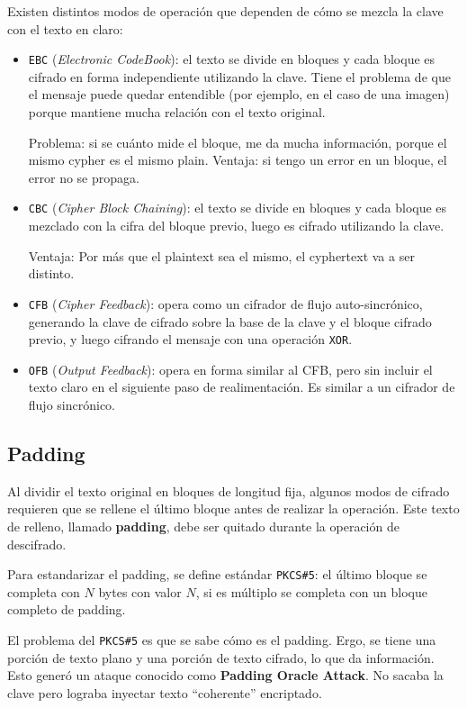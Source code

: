 Existen distintos modos de operación que dependen de cómo se mezcla la clave con el texto en claro:
\begin{itemize}
	\item \texttt{EBC} (\emph{Electronic CodeBook}): el texto se divide en bloques y cada bloque es cifrado en forma independiente utilizando la clave. Tiene el problema de que el mensaje puede quedar entendible (por ejemplo, en el caso de una imagen) porque mantiene mucha relación con el texto original.

	Problema: si se cuánto mide el bloque, me da mucha información, porque el mismo cypher es el mismo plain.
	Ventaja: si tengo un error en un bloque, el error no se propaga.

	\item \texttt{CBC} (\emph{Cipher Block Chaining}): el texto se divide en bloques y cada bloque es mezclado con la cifra del bloque previo, luego es cifrado utilizando la clave. 

	Ventaja: Por más que el plaintext sea el mismo, el cyphertext va a ser distinto.

	\item \texttt{CFB} (\emph{Cipher Feedback}): opera como un cifrador de flujo auto-sincrónico, generando la clave de cifrado sobre la base de la clave y el bloque cifrado previo, y luego cifrando el mensaje con una operación \texttt{XOR}.
	\item \texttt{OFB} (\emph{Output Feedback}): opera en forma similar al CFB, pero sin incluir el texto claro en el siguiente paso de realimentación. Es similar a un cifrador de flujo sincrónico.
\end{itemize}

\subsection{Padding}
Al dividir el texto original en bloques de longitud fija, algunos modos de cifrado requieren que se rellene el último bloque antes de realizar la operación. Este texto de relleno, llamado \textbf{padding}, debe ser quitado durante la operación de descifrado.

Para estandarizar el padding, se define estándar \texttt{PKCS\#5}: el último bloque se completa con $N$ bytes con valor $N$, si es múltiplo se completa con un bloque completo de padding.


El problema del \texttt{PKCS\#5} es que se sabe cómo es el padding. Ergo, se tiene una porción de texto plano y una porción de texto cifrado, lo que da información. Esto generó un ataque conocido como \textbf{Padding Oracle Attack}. No sacaba la clave pero lograba inyectar texto ``coherente'' encriptado.

